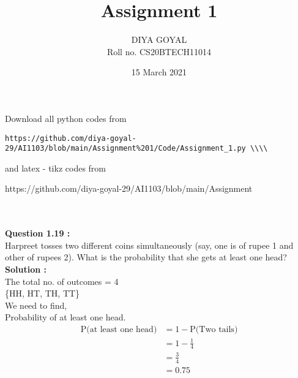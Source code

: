 \documentclass[journal,12pt,twocolumn]{IEEEtran}
\title{Assignment 1}
\author{DIYA GOYAL\\
Roll no. CS20BTECH11014}
\date{15 March 2021}
\begin{document}
\maketitle
\large Download all python codes from\\
\begin{lstlisting}
https://github.com/diya-goyal-29/AI1103/blob/main/Assignment%201/Code/Assignment_1.py \\\\
\end{lstlisting}
\large and latex - tikz codes from \\
\begin{tcolorbox}
https://github.com/diya-goyal-29/AI1103/blob/main/Assignment%
\end{tcolorbox}
\\ \\
\large\textbf{Question 1.19 :} \\
Harpreet tosses two different coins simultaneously (say, one is of rupee 1 and other of rupees 2). What is the probability that she gets at least one head? \\
\large\textbf{Solution :}\\
The total no. of outcomes = 4\\ 
\{HH, HT, TH, TT\}\\
We need to find,\\
Probability of at least one head.\\
\begin{equation}
    \begin{split}
        \text{P(at least one head)} & = 1 - \text{P(Two tails)}\\ 
        & = 1 - \frac{1}{4}\\
        & = \frac{3}{4}\\
        & = 0.75\\
    \end{split}
\end{equation}
\end{document}
